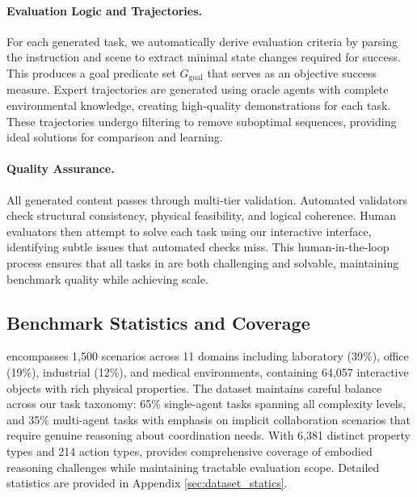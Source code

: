 \paragraph{Evaluation Logic and Trajectories.}
For each generated task, we automatically derive evaluation criteria by parsing the instruction and scene to extract minimal state changes required for success. This produces a goal predicate set $G_{\text{goal}}$ that serves as an objective success measure. Expert trajectories are generated using oracle agents with complete environmental knowledge, creating high-quality demonstrations for each task. These trajectories undergo filtering to remove suboptimal sequences, providing ideal solutions for comparison and learning.

\paragraph{Quality Assurance.}
All generated content passes through multi-tier validation. Automated validators check structural consistency, physical feasibility, and logical coherence. Human evaluators then attempt to solve each task using our interactive interface, identifying subtle issues that automated checks miss. This human-in-the-loop process ensures that all tasks in \benchmark are both challenging and solvable, maintaining benchmark quality while achieving scale.

\subsection{Benchmark Statistics and Coverage}

\benchmark encompasses 1,500 scenarios across 11 domains including laboratory (39\%), office (19\%), industrial (12\%), and medical environments, containing 64,057 interactive objects with rich physical properties. The dataset maintains careful balance across our task taxonomy: 65\% single-agent tasks spanning all complexity levels, and 35\% multi-agent tasks with emphasis on implicit collaboration scenarios that require genuine reasoning about coordination needs. With 6,381 distinct property types and 214 action types, \benchmark provides comprehensive coverage of embodied reasoning challenges while maintaining tractable evaluation scope. Detailed statistics are provided in Appendix \ref{sec:dataset_statics}.


